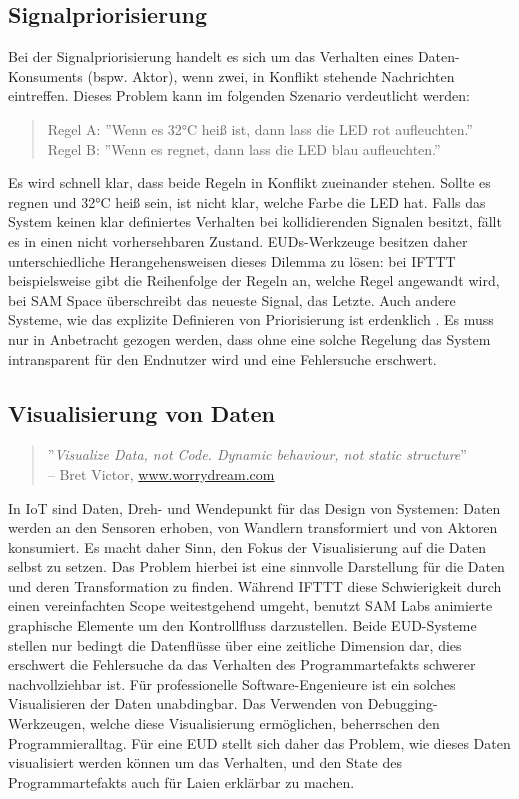 \subsection{Signalpriorisierung}
Bei der Signalpriorisierung handelt es sich um das Verhalten eines Daten-Konsuments (bspw. Aktor), wenn zwei, in Konflikt stehende Nachrichten eintreffen. Dieses Problem kann im folgenden Szenario verdeutlicht werden:
\begin{quote}
Regel A: ''Wenn es 32°C heiß ist, dann lass die LED rot aufleuchten.'' \\
Regel B: ''Wenn es regnet, dann lass die LED blau aufleuchten.''
\end{quote}
Es wird schnell klar, dass beide Regeln in Konflikt zueinander stehen. Sollte es regnen und 32°C heiß sein, ist nicht klar, welche Farbe die LED hat. Falls das System keinen klar definiertes Verhalten bei kollidierenden Signalen besitzt, fällt es in einen nicht vorhersehbaren Zustand. \acp{EUD}-Werkzeuge besitzen daher unterschiedliche Herangehensweisen dieses Dilemma zu lösen: bei IFTTT beispielsweise gibt die Reihenfolge der Regeln an, welche Regel angewandt wird, bei SAM Space überschreibt das neueste Signal, das Letzte. Auch andere Systeme, wie das explizite Definieren von Priorisierung ist erdenklich \cite{MacLaurin2011kodu}. Es muss nur in Anbetracht gezogen werden, dass ohne eine solche Regelung das System intransparent für den Endnutzer wird und eine Fehlersuche erschwert.

\subsection{Visualisierung von Daten}
\begin{quote}
    ''\textit{Visualize Data, not Code. Dynamic behaviour, not static structure}'' \\ -- Bret Victor, \url{www.worrydream.com}
\end{quote}
In \ac{IoT} sind Daten, Dreh- und Wendepunkt für das Design von Systemen: Daten werden an den Sensoren erhoben, von Wandlern transformiert und von Aktoren konsumiert. Es macht daher Sinn, den Fokus der Visualisierung auf die Daten selbst zu setzen. Das Problem hierbei ist eine sinnvolle Darstellung für die Daten und deren Transformation zu finden. Während IFTTT diese Schwierigkeit durch einen vereinfachten Scope weitestgehend umgeht, benutzt SAM Labs animierte graphische Elemente um den Kontrollfluss darzustellen. Beide \ac{EUD}-Systeme stellen nur bedingt die Datenflüsse über eine zeitliche Dimension dar, dies erschwert die Fehlersuche da das Verhalten des Programmartefakts schwerer nachvollziehbar ist. Für professionelle Software-Engenieure ist ein solches Visualisieren der Daten unabdingbar. Das Verwenden von Debugging-Werkzeugen, welche diese Visualisierung ermöglichen, beherrschen den Programmier\-alltag. Für eine \ac{EUD} stellt sich daher das Problem, wie dieses Daten visualisiert werden können um das Verhalten, und den State des Programmartefakts auch für Laien erklärbar zu machen. 

